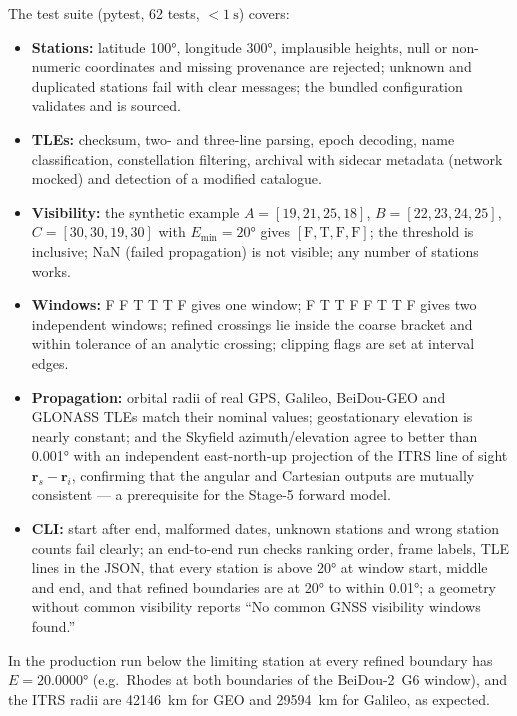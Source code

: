 \documentclass[11pt,a4paper]{article}
\newcommand{\code}[1]{{\ttfamily\def\_{\textunderscore\allowbreak}#1}}
\newcommand{\vect}[1]{\mathbf{#1}}
\begin{document}
The test suite (\code{pytest}, 62 tests, $<\SI{1}{\second}$) covers:
\begin{itemize}
\item \textbf{Stations:} latitude \ang{100}, longitude \ang{300}, implausible
heights, \code{null} or non-numeric coordinates and missing provenance are
rejected; unknown and duplicated stations fail with clear messages; the
bundled configuration validates and is sourced.
\item \textbf{TLEs:} checksum, two- and three-line parsing, epoch decoding,
name classification, constellation filtering, archival with sidecar
metadata (network mocked) and detection of a modified catalogue.
\item \textbf{Visibility:} the synthetic example
$A=[19,21,25,18]$, $B=[22,23,24,25]$, $C=[30,30,19,30]$ with $E_{\min}=\ang{20}$
gives $[\text{F},\text{T},\text{F},\text{F}]$; the threshold is inclusive;
NaN (failed propagation) is not visible; any number of stations works.
\item \textbf{Windows:} \code{F F T T T F} gives one window;
\code{F T T F F T T F} gives two independent windows; refined crossings lie
inside the coarse bracket and within tolerance of an analytic crossing;
clipping flags are set at interval edges.
\item \textbf{Propagation:} orbital radii of real GPS, Galileo, BeiDou-GEO and
GLONASS TLEs match their nominal values; geostationary elevation is nearly
constant; and the Skyfield azimuth/elevation agree to better than
\ang{0.001} with an independent east-north-up projection of the ITRS line of
sight $\vect r_s-\vect r_i$, confirming that the angular and Cartesian outputs
are mutually consistent --- a prerequisite for the Stage-5 forward model.
\item \textbf{CLI:} start after end, malformed dates, unknown stations and
wrong station counts fail clearly; an end-to-end run checks ranking order,
frame labels, TLE lines in the JSON, that every station is above
\ang{20} at window start, middle and end, and that refined boundaries are at
\ang{20} to within \ang{0.01}; a geometry without common visibility reports
``No common GNSS visibility windows found.''
\end{itemize}
In the production run below the limiting station at every refined boundary
has $E=\ang{20.0000}$ (e.g.\ Rhodes at both boundaries of the BeiDou-2~G6
window), and the ITRS radii are \SI{42146}{\kilo\metre} for GEO and
\SI{29594}{\kilo\metre} for Galileo, as expected.

\end{document}
